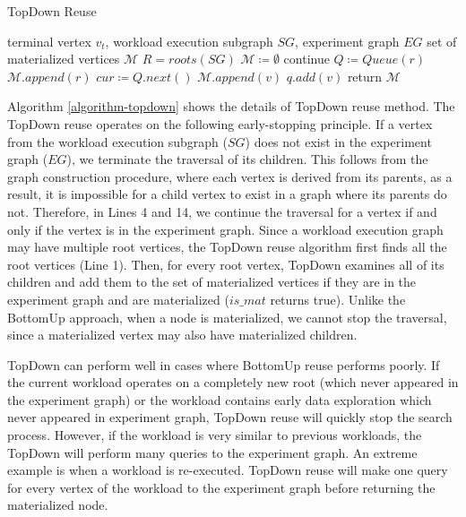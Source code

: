 \begin{algorithm}[h]
\caption{TopDown Reuse}\label{algorithm-topdown}
\begin{algorithmic}[1]
\Require terminal vertex $v_t$, workload execution subgraph  $SG$, experiment graph $EG$ 
\Ensure set of materialized vertices $\mathcal{M}$ 
\State $R=roots(SG)$
\State $\mathcal{M} \coloneqq \emptyset$
		\State continue 
	\EndIf
	\State $Q \coloneqq  Queue(r)$  
		 \State	 $\mathcal{M}.append(r)$
	\EndIf
			\State $cur \coloneqq  Q.next()$
					\State	$\mathcal{M}.append(v)$
				\EndIf
					\State $q.add(v)$
				\EndIf
			\EndFor
		\EndWhile
\EndFor
\State return $\mathcal{M}$
\end{algorithmic}
\end{algorithm}
Algorithm \ref{algorithm-topdown} shows the details of TopDown reuse method.
The TopDown reuse operates on the following early-stopping principle.
If a vertex from the workload execution subgraph ($SG$) does not exist in the experiment graph ($EG$), we terminate the traversal of its children.
This follows from the graph construction procedure, where each vertex is derived from its parents, as a result, it is impossible for a child vertex to exist in a graph where its parents do not.
Therefore, in Lines 4 and 14, we continue the traversal for a vertex if and only if the vertex is in the experiment graph.
Since a workload execution graph may have multiple root vertices, the TopDown reuse algorithm first finds all the root vertices (Line 1).
Then, for every root vertex, TopDown examines all of its children and add them to the set of materialized vertices if they are in the experiment graph and are materialized ($is\_mat$ returns true).
Unlike the BottomUp approach, when a node is materialized, we cannot stop the traversal, since a materialized vertex may also have materialized children.

TopDown can perform well in cases where BottomUp reuse performs poorly.
If the current workload operates on a completely new root (which never appeared in the experiment graph) or the workload contains early data exploration which never appeared in experiment graph, TopDown reuse will quickly stop the search process.
However, if the workload is very similar to previous workloads, the TopDown will perform many queries to the experiment graph.
An extreme example is when a workload is re-executed.
TopDown reuse will make one query for every vertex of the workload to the experiment graph before returning the materialized node.

